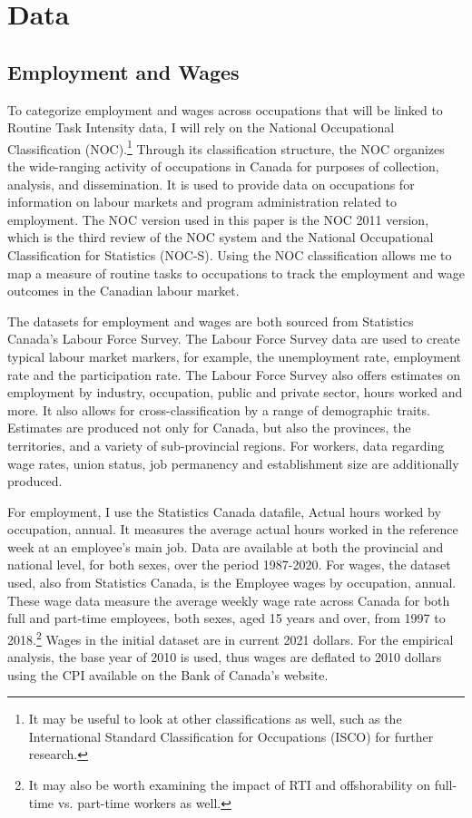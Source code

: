 \documentclass[undefended]{bumrp}
\begin{document}
\chapter{Data}

\section{Employment and Wages}

 To categorize employment and wages across occupations that will be linked to Routine Task Intensity data, I will rely on the National Occupational Classification (NOC).\footnote{It may be useful to look at other classifications as well, such as the International Standard Classification for Occupations (ISCO) for further research.} Through its classification structure, the NOC organizes the wide-ranging activity of occupations in Canada for purposes of collection, analysis, and dissemination. It is used to provide data on occupations for information on labour markets and program administration related to employment. The NOC version used in this paper is the NOC 2011 version, which is the third review of the NOC system and the National Occupational Classification for Statistics (NOC-S). Using the NOC classification allows me to map a measure of routine tasks to occupations to track the employment and wage outcomes in the Canadian labour market.

The datasets for employment and wages are both sourced from Statistics Canada’s Labour Force Survey. The Labour Force Survey data are used to create typical labour market markers, for example, the unemployment rate, employment rate and the participation rate. The Labour Force Survey also offers estimates on employment by industry, occupation, public and private sector, hours worked and more. It also allows for cross-classification by a range of demographic traits. Estimates are produced not only for Canada, but also the provinces, the territories, and a variety of sub-provincial regions. For workers, data regarding wage rates, union status, job permanency and establishment size are additionally produced.

For employment, I use the Statistics Canada datafile, Actual hours worked by occupation, annual. It measures the average actual hours worked in the reference week at an employee’s main job. Data are available at both the provincial and national level, for both sexes, over the period 1987-2020. For wages, the dataset used, also from Statistics Canada, is the Employee wages by occupation, annual. These wage data measure the average weekly wage rate across Canada for both full and part-time employees,  both sexes, aged 15 years and over, from 1997 to 2018.\footnote{It may also be worth examining the impact of RTI and offshorability on full-time vs. part-time workers as well.}  Wages in the initial dataset are in current 2021 dollars. For the empirical analysis, the base year of 2010 is used, thus wages are deflated to 2010 dollars using the CPI available on the Bank of Canada’s website.
\end{document}
